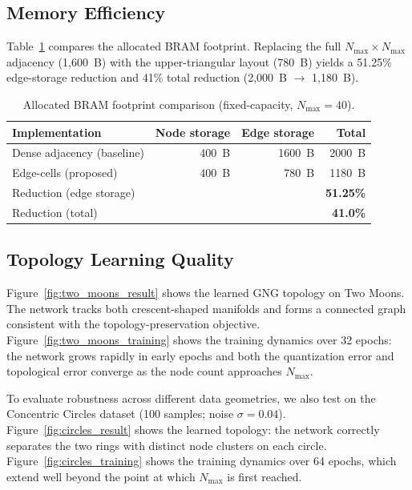 \documentclass[conference]{IEEEtran}
\begin{document}
\subsection{Memory Efficiency}
Table~\ref{tab:memory} compares the allocated BRAM footprint. Replacing the full $N_{\max}\!\times\!N_{\max}$ adjacency (1,600~B) with the upper-triangular layout (780~B) yields a 51.25\% edge-storage reduction and 41\% total reduction (2,000~B $\rightarrow$ 1,180~B).

\begin{table}[!h]
\centering
\caption{Allocated BRAM footprint comparison (fixed-capacity, $N_{\max}=40$).}
\label{tab:memory}
\footnotesize
\begin{tabular}{lrrr}
\toprule
\textbf{Implementation} & \textbf{Node storage} & \textbf{Edge storage} & \textbf{Total} \\
\midrule
Dense adjacency (baseline) & 400~B & 1600~B & 2000~B \\
Edge-cells (proposed)      & 400~B &  780~B & 1180~B \\
\midrule
\multicolumn{3}{l}{Reduction (edge storage)} & \textbf{51.25\%} \\
\multicolumn{3}{l}{Reduction (total)}        & \textbf{41.0\%} \\
\bottomrule
\end{tabular}
\end{table}

\subsection{Topology Learning Quality}
Figure~\ref{fig:two_moons_result} shows the learned GNG topology on Two Moons. The network tracks both crescent-shaped manifolds and forms a connected graph consistent with the topology-preservation objective. Figure~\ref{fig:two_moons_training} shows the training dynamics over 32 epochs: the network grows rapidly in early epochs and both the quantization error and topological error converge as the node count approaches $N_{\max}$.

To evaluate robustness across different data geometries, we also test on the Concentric Circles dataset (100 samples; noise $\sigma=0.04$). Figure~\ref{fig:circles_result} shows the learned topology: the network correctly separates the two rings with distinct node clusters on each circle. Figure~\ref{fig:circles_training} shows the training dynamics over 64 epochs, which extend well beyond the point at which $N_{\max}$ is first reached.
\end{document}
